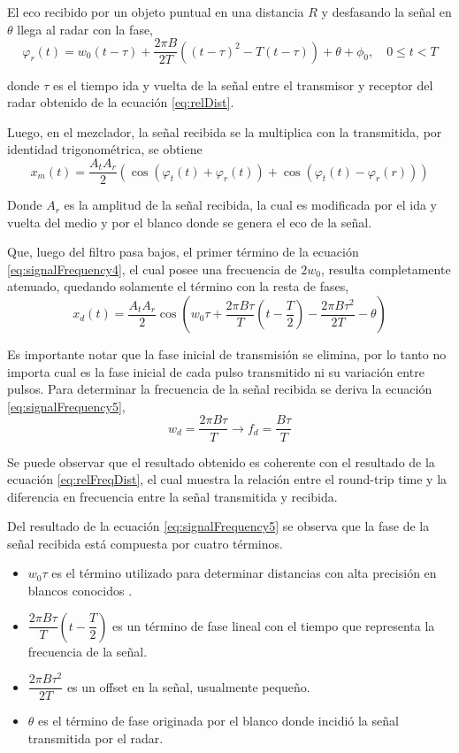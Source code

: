 El eco recibido por un objeto puntual en una distancia $R$ y desfasando la señal en $\theta$ llega al radar con la fase,
\begin{equation}
  \varphi_r(t) = w_0(t-\tau) + \dfrac{2\pi B}{2T}((t - \tau)^2-T(t - \tau)) + \theta + \phi_0,\quad 0 \le t < T
  \label{eq:signalFrequency3}
\end{equation}

donde $\tau$ es el tiempo ida y vuelta de la señal entre el transmisor y receptor del radar obtenido de la ecuación \ref{eq:relDist}.

Luego, en el mezclador, la señal recibida se la multiplica con la transmitida, por identidad trigonométrica, se obtiene
\begin{equation}
  x_m(t) = \dfrac{A_tA_r}{2}(\cos(\varphi_t(t)+\varphi_r(t)) + \cos(\varphi_t(t)- \varphi_r(r)))
  \label{eq:signalFrequency4}
\end{equation}

Donde $A_r$ es la amplitud de la señal recibida, la cual es modificada por el ida y vuelta del medio y por el blanco donde se genera el eco de la señal.

Que, luego del filtro pasa bajos, el primer término de la ecuación \ref{eq:signalFrequency4}, el cual posee una frecuencia de $2w_0$, resulta completamente atenuado, quedando solamente el término con la resta de fases,
\begin{equation}
  x_d(t) = \dfrac{A_tA_r}{2}\cos(w_0\tau + \dfrac{2\pi B\tau}{T}(t - \dfrac{T}{2}) - \dfrac{2\pi B\tau^2}{2T} - \theta)
  \label{eq:signalFrequency5}
\end{equation}

Es importante notar que la fase inicial de transmisión se elimina, por lo tanto no importa cual es la fase inicial de cada pulso
transmitido ni su variación entre pulsos. Para determinar la frecuencia de la señal recibida se deriva la ecuación \ref{eq:signalFrequency5}, 
\begin{equation}\label{eq:beatFreq}
  w_d = \dfrac{2\pi B\tau}{T} \rightarrow f_d = \dfrac{B\tau}{T}
\end{equation}

Se puede observar que el resultado obtenido es coherente con el resultado de la ecuación \ref{eq:relFreqDist}, el cual muestra la relación entre el round-trip time y la diferencia en frecuencia entre la señal transmitida y recibida.

Del resultado de la ecuación \ref{eq:signalFrequency5} se observa que la fase de la señal recibida está compuesta por cuatro términos.
\begin{itemize}
  \item $w_0\tau$ es el término utilizado para determinar distancias con alta precisión en blancos conocidos \cite{Brennan2014a}.
  \item $\dfrac{2\pi B\tau}{T}(t - \dfrac{T}{2})$ es un término de fase lineal con el tiempo que representa la frecuencia de la señal.
  \item $\dfrac{2\pi B\tau^2}{2T}$ es un offset en la señal, usualmente pequeño.
  \item $\theta$ es el término de fase originada por el blanco donde incidió la señal transmitida por el radar.
\end{itemize}

